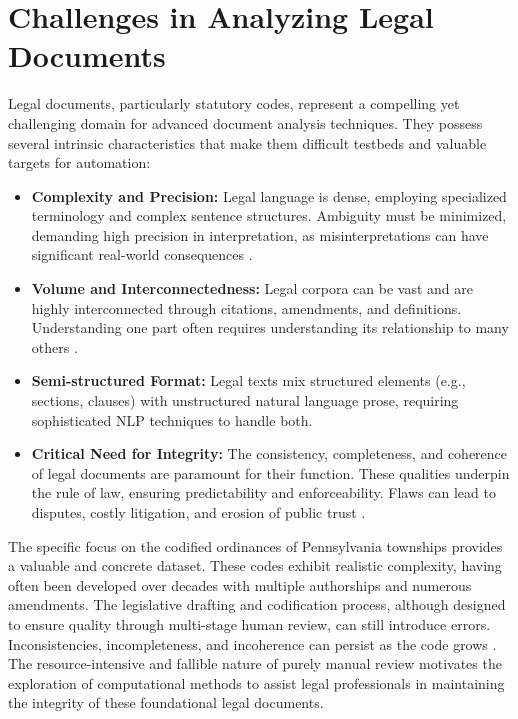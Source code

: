 \section{Challenges in Analyzing Legal Documents} \label{sec:legal_docs}
Legal documents, particularly statutory codes, represent a compelling yet challenging domain for advanced document analysis techniques. They possess several intrinsic characteristics that make them difficult testbeds and valuable targets for automation:
\begin{itemize}
    \item \textbf{Complexity and Precision:} Legal language is dense, employing specialized terminology and complex sentence structures. Ambiguity must be minimized, demanding high precision in interpretation, as misinterpretations can have significant real-world consequences \parencite{RefWorks:RefID:159-ashley2017artificial, RefWorks:RefID:62-malik2022semantic}.
    \item \textbf{Volume and Interconnectedness:} Legal corpora can be vast and are highly interconnected through citations, amendments, and definitions. Understanding one part often requires understanding its relationship to many others \parencite{RefWorks:RefID:68-beth2018bills}.
    \item \textbf{Semi-structured Format:} Legal texts mix structured elements (e.g., sections, clauses) with unstructured natural language prose, requiring sophisticated NLP techniques to handle both.
    \item \textbf{Critical Need for Integrity:} The consistency, completeness, and coherence of legal documents are paramount for their function. These qualities underpin the rule of law, ensuring predictability and enforceability. Flaws can lead to disputes, costly litigation, and erosion of public trust \parencite{RefWorks:RefID:52-donelson2019legal, RefWorks:RefID:53-duck-mayr2022explaining, RefWorks:RefID:54-rossi2016inconsistent}.
\end{itemize}

The specific focus on the codified ordinances of Pennsylvania townships provides a valuable and concrete dataset. These codes exhibit realistic complexity, having often been developed over decades with multiple authorships and numerous amendments. The legislative drafting and codification process, although designed to ensure quality through multi-stage human review, can still introduce errors. Inconsistencies, incompleteness, and incoherence can persist as the code grows \parencite{RefWorks:RefID:54-rossi2016inconsistent}. The resource-intensive and fallible nature of purely manual review motivates the exploration of computational methods to assist legal professionals in maintaining the integrity of these foundational legal documents.

